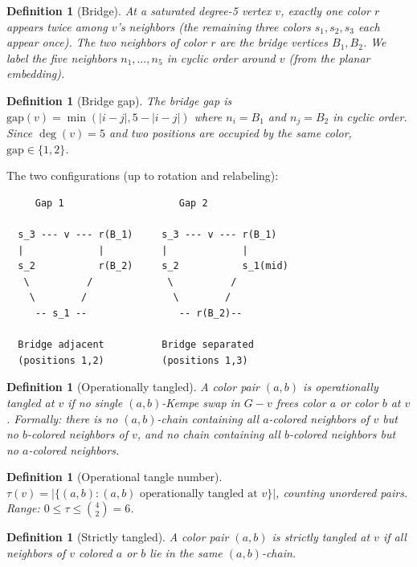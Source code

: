 \documentclass[11pt]{article}
\newtheorem{definition}[theorem]{Definition}
\theoremstyle{remark}
\begin{document}
\begin{definition}[Bridge]
At a saturated degree-5 vertex $v$, exactly one color $r$ appears twice among $v$'s neighbors (the remaining three colors $s_1, s_2, s_3$ each appear once). The two neighbors of color $r$ are the \emph{bridge vertices} $B_1, B_2$. We label the five neighbors $n_1, \ldots, n_5$ in cyclic order around $v$ (from the planar embedding).
\end{definition}

\begin{definition}[Bridge gap]
The \emph{bridge gap} is $\mathrm{gap}(v) = \min(|i - j|, 5 - |i - j|)$ where $n_i = B_1$ and $n_j = B_2$ in cyclic order. Since $\deg(v) = 5$ and two positions are occupied by the same color, $\mathrm{gap} \in \{1, 2\}$.
\end{definition}

The two configurations (up to rotation and relabeling):

\begin{verbatim}
     Gap 1                    Gap 2

  s_3 --- v --- r(B_1)     s_3 --- v --- r(B_1)
  |             |          |             |
  s_2           r(B_2)     s_2           s_1(mid)
   \          /             \          /
    \        /               \        /
     -- s_1 --                -- r(B_2)--

  Bridge adjacent          Bridge separated
  (positions 1,2)          (positions 1,3)
\end{verbatim}

\begin{definition}[Operationally tangled]
A color pair $(a, b)$ is \emph{operationally tangled} at $v$ if no single $(a,b)$-Kempe swap in $G - v$ frees color $a$ or color $b$ at $v$. Formally: there is no $(a,b)$-chain containing all $a$-colored neighbors of $v$ but no $b$-colored neighbors of $v$, and no chain containing all $b$-colored neighbors but no $a$-colored neighbors.
\end{definition}

\begin{definition}[Operational tangle number]
$\tau(v) = |\{(a,b) : (a,b) \text{ operationally tangled at } v\}|$, counting unordered pairs. Range: $0 \leq \tau \leq \binom{4}{2} = 6$.
\end{definition}

\begin{definition}[Strictly tangled]
A color pair $(a,b)$ is \emph{strictly tangled} at $v$ if all neighbors of $v$ colored $a$ or $b$ lie in the same $(a,b)$-chain.
\end{definition}
\end{document}
